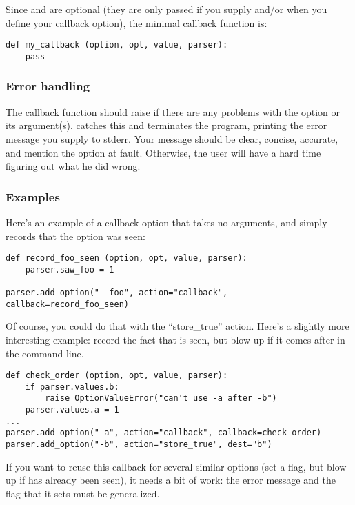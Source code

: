 Since  and  are optional (they are only passed
if you supply  and/or  when
you define your callback option), the minimal callback function is:

\begin{verbatim}
def my_callback (option, opt, value, parser):
    pass
\end{verbatim}

\subsubsection{Error handling\label{optparse-callback-error-handling}}

The callback function should raise  if
there are any problems with the option or its
argument(s).  catches this and terminates the
program, printing the error message you supply to stderr.  Your
message should be clear, concise, accurate, and mention the option at
fault.  Otherwise, the user will have a hard time figuring out what he
did wrong.

\subsubsection{Examples\label{optparse-callback-examples}}

Here's an example of a callback option that takes no arguments, and
simply records that the option was seen:

\begin{verbatim}
def record_foo_seen (option, opt, value, parser):
    parser.saw_foo = 1

parser.add_option("--foo", action="callback", callback=record_foo_seen)
\end{verbatim}

Of course, you could do that with the ``store_true'' action.  Here's a
slightly more interesting example: record the fact that
 is seen, but blow up if it comes after 
in the command-line.

\begin{verbatim}
def check_order (option, opt, value, parser):
    if parser.values.b:
        raise OptionValueError("can't use -a after -b")
    parser.values.a = 1
...
parser.add_option("-a", action="callback", callback=check_order)
parser.add_option("-b", action="store_true", dest="b")
\end{verbatim}

If you want to reuse this callback for several similar options (set a
flag, but blow up if  has already been seen), it needs
a bit of work: the error message and the flag that it sets must be
generalized.

